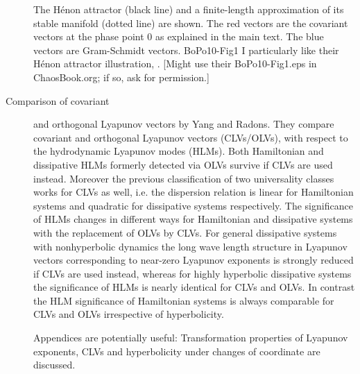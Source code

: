 \begin{description}
%
 {}{
The H\'enon attractor (black line) and a finite-length
approximation of its stable manifold (dotted line) are shown.
The red vectors are the covariant vectors at the phase point
0 as explained in the main text. The blue vectors are
Gram-Schmidt vectors.
}{BoPo10-Fig1}
%
I particularly like their H\'enon attractor illustration,
.
[Might use their BoPo10-Fig1.eps in ChaosBook.org; if so,
ask for permission.]

\item[Comparison of covariant] and orthogonal {Lyapunov
vectors} by Yang and Radons. They compare
covariant and orthogonal Lyapunov vectors (CLVs/OLVs), with
respect to the hydrodynamic Lyapunov modes (HLMs). Both
Hamiltonian and dissipative HLMs formerly detected via OLVs
survive if CLVs are used instead. Moreover the previous
classification of two universality classes works for CLVs as
well, i.e. the dispersion relation is linear for Hamiltonian
systems and quadratic for dissipative systems respectively.
The significance of HLMs changes in different ways for
Hamiltonian and dissipative systems with the replacement of
OLVs by CLVs. For general dissipative systems with
nonhyperbolic dynamics the long wave length structure in
Lyapunov vectors corresponding to near-zero Lyapunov
exponents is strongly reduced if CLVs are used instead,
whereas for highly hyperbolic dissipative systems the
significance of HLMs is nearly identical for CLVs and OLVs.
In contrast the HLM significance of Hamiltonian systems is
always comparable for CLVs and OLVs irrespective of
hyperbolicity.

Appendices are potentially useful: Transformation properties
of Lyapunov exponents, CLVs and hyperbolicity under changes
of coordinate are discussed.


\end{description}



\renewcommand{\ssp}{a}
